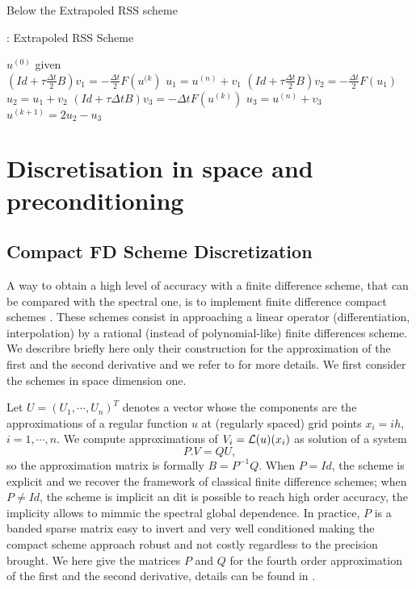 \documentclass[11pt]{article}
\begin{document}
{Below the Extrapoled RSS scheme\\
 \begin{center}
\begin{minipage}[H]{12cm}
  \begin{algorithm}[H]
    \caption{: Extrapoled RSS Scheme}\label{ExtraRSS}
    \begin{algorithmic}[1]
        \State $u^{(0)}$ given\\
              $ (Id+\tau \frac{\Delta t}{2}B) v_1=-\frac{\Delta t}{2} F(u^{(k})$
               $u_1=u^{(n)} +v_1$
                $ (Id+\tau \frac{\Delta t}{2}B) v_2=-\frac{\Delta t}{2} F(u_1)$
                $u_2=u_1+v_2$
                $(Id+\tau \Delta tB) v_3=-\Delta t  F(u^{(k)})$
                $u_3=u^{(n)}+v_3$
                 $u^{(k+1)}=2u_2-u_3$              
            \EndFor
    \end{algorithmic}
    \end{algorithm}
\end{minipage}
\end{center}
\section{Discretisation in space and preconditioning}
\subsection{Compact FD Scheme Discretization}
A way to obtain a high level of accuracy with a finite difference scheme, that can be compared with the spectral one, is to implement finite difference compact schemes \cite{Lele}. These schemes consist in approaching a linear operator (differentiation, interpolation) by a rational (instead of polynomial-like) finite differences scheme. 
We describre briefly here only their construction for the approximation of the first and the second derivative and we refer to \cite{Lele} for more details. We first consider the schemes in space dimension one.

Let $U=(U_1,\cdots,U_n)^T$ denotes a vector whose the components are the approximations of a regular function $u$ at (regularly spaced) grid points $x_i=ih$, $i=1,\cdots, n$.  We compute approximations of $V_i={\cal L}(u)(x_i)$ as solution of a system
$$
P . V= Q U,
$$
so the approximation matrix is formally $B=P^{-1}Q$.
When $P=Id$, the scheme is explicit and we recover the framework of classical finite difference schemes;  when $P\neq Id$, the scheme is implicit an dit is possible to reach high order accuracy, the implicity allows to mimmic the spectral global dependence. In practice, $P$ is a banded sparse matrix easy to invert and very well conditioned making the compact scheme approach robust and not costly regardless to the precision brought.
We here give the matrices $P$ and $Q$ for the fourth order approximation of the first and the second derivative, details can be found in \cite{Lele}.

}
\end{document}
